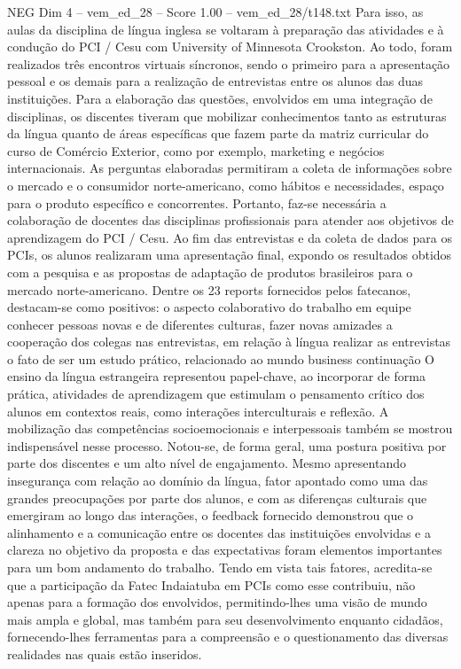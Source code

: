 \begin{textsample}{NEG Dim 4 – vem\_ed\_28 – Score 1.00 – vem\_ed\_28/t148.txt}
Para isso, as aulas da disciplina de língua inglesa se voltaram à preparação das atividades e à condução do PCI / Cesu com University of Minnesota Crookston.
Ao todo, foram realizados três encontros virtuais síncronos, sendo o primeiro para a apresentação pessoal e os demais para a realização de entrevistas entre os alunos das duas instituições.
Para a elaboração das questões, envolvidos em uma integração de disciplinas, os discentes tiveram que mobilizar conhecimentos tanto as estruturas da língua quanto de áreas específicas que fazem parte da matriz curricular do curso de Comércio Exterior, como por exemplo, marketing e negócios internacionais.
As perguntas elaboradas permitiram a coleta de informações sobre o mercado e o consumidor norte-americano, como hábitos e necessidades, espaço para o produto específico e concorrentes.
Portanto, faz-se necessária a colaboração de docentes das disciplinas profissionais para atender aos objetivos de aprendizagem do PCI / Cesu.
Ao fim das entrevistas e da coleta de dados para os PCIs, os alunos realizaram uma apresentação final, expondo os resultados obtidos com a pesquisa e as propostas de adaptação de produtos brasileiros para o mercado norte-americano.
Dentre os 23 reports fornecidos pelos fatecanos, destacam-se como positivos: o aspecto colaborativo do trabalho em equipe conhecer pessoas novas e de diferentes culturas, fazer novas amizades a cooperação dos colegas nas entrevistas, em relação à língua realizar as entrevistas o fato de ser um estudo prático, relacionado ao mundo business continuação O ensino da língua estrangeira representou papel-chave, ao incorporar de forma prática, atividades de aprendizagem que estimulam o pensamento crítico dos alunos em contextos reais, como interações interculturais e reflexão.
A mobilização das competências socioemocionais e interpessoais também se mostrou indispensável nesse processo.
Notou-se, de forma geral, uma postura positiva por parte dos discentes e um alto nível de engajamento.
Mesmo apresentando insegurança com relação ao domínio da língua, fator apontado como uma das grandes preocupações por parte dos alunos, e com as diferenças culturais que emergiram ao longo das interações, o feedback fornecido demonstrou que o alinhamento e a comunicação entre os docentes das instituições envolvidas e a clareza no objetivo da proposta e das expectativas foram elementos importantes para um bom andamento do trabalho.
Tendo em vista tais fatores, acredita-se que a participação da Fatec Indaiatuba em PCIs como esse contribuiu, não apenas para a formação dos envolvidos, permitindo-lhes uma visão de mundo mais ampla e global, mas também para seu desenvolvimento enquanto cidadãos, fornecendo-lhes ferramentas para a compreensão e o questionamento das diversas realidades nas quais estão inseridos.

\end{textsample}
